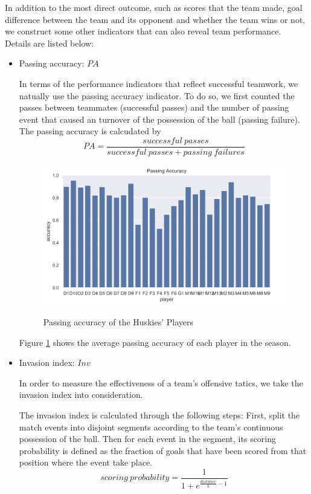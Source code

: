 \documentclass{mcmthesis}
\begin{document}
In addition to the most direct outcome, such as scores that the team made, goal difference between the team and its opponent and whether the team wins or not, we construct some other indicators that can also reveal team performance. Details are listed below:
\begin{itemize}
  \item Passing accuracy: $PA$
  
  In terms of the performance indicators that reflect successful teamwork, we natually use the passing accuracy indicator. To do so, we first counted the passes between teammates (successful passes) and the number of passing event that caused an turnover of the possession of the ball (passing failure). The passing accuracy is calcudated by
\begin{equation}
  PA = \frac{successful \  passes}{successful \  passes + passing \  failures}
\end{equation}
\begin{figure}[htbp]
  \centering
  \caption{Passing accuracy of the Huskies' Players}
  \includegraphics[width=12cm]{pa.png}
  \label{pa}
\end{figure}

Figure \ref{pa} shows the average passing accuracy of each player in the season.

  \item Invasion index: $Inv$
  
  In order to measure the effectiveness of a team's offensive tatics, we take the invasion index into consideration.
  
  The invasion index is calculated through the following steps:
  First, split the match events into disjoint segments according to the team's continuous possession of the ball. Then for each event in the segment, its scoring probability is defined as the fraction of goals that have been scored from that position where the event take place.
\begin{equation}
  scoring \  probability= \frac{1}{1+e^{\frac{distance}{k}-1}}
\end{equation}


\end{itemize}
\end{document}
